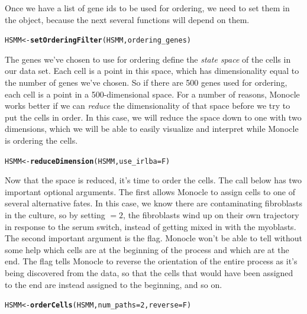 \documentclass[10pt,oneside]{article}\usepackage[]{graphicx}\usepackage[]{color}
\makeatletter
\newcommand{\hlnum}[1]{\textcolor[rgb]{0.686,0.059,0.569}{#1}}%
\newcommand{\hlstd}[1]{\textcolor[rgb]{0.345,0.345,0.345}{#1}}%
\newcommand{\hlkwb}[1]{\textcolor[rgb]{0.69,0.353,0.396}{#1}}%
\newcommand{\hlkwc}[1]{\textcolor[rgb]{0.333,0.667,0.333}{#1}}%
\newcommand{\hlkwd}[1]{\textcolor[rgb]{0.737,0.353,0.396}{\textbf{#1}}}%
\newenvironment{kframe}{%
 \def\at@end@of@kframe{}%
 \ifinner\ifhmode%
  \def\at@end@of@kframe{\end{minipage}}%
  \begin{minipage}{\columnwidth}%
 \fi\fi%
 \def\FrameCommand##1{\hskip\@totalleftmargin \hskip-\fboxsep
 \colorbox{shadecolor}{##1}\hskip-\fboxsep
     \hskip-\linewidth \hskip-\@totalleftmargin \hskip\columnwidth}%
 \MakeFramed {\advance\hsize-\width
   \@totalleftmargin\z@ \linewidth\hsize
   \@setminipage}}%
 {\par\unskip\endMakeFramed%
 \at@end@of@kframe}
\newenvironment{knitrout}{}{} %
\makeatother
\begin{document}
Once we have a list of gene ids to be used for ordering, we need to set them in the  object, because the next several functions will depend on them.

\begin{knitrout}
\color{fgcolor}\begin{kframe}
\begin{alltt}
\hlstd{HSMM} \hlkwb{<-} \hlkwd{setOrderingFilter}\hlstd{(HSMM, ordering_genes)}
\end{alltt}
\end{kframe}
\end{knitrout}


The genes we've chosen to use for ordering define the \emph{state space} of the cells in our data set.  Each cell is a point in this space, which has dimensionality equal to the number of genes we've chosen.  So if there are 500 genes used for ordering, each cell is a point in a 500-dimensional space.  For a number of reasons, Monocle works better if we can \emph{reduce} the dimensionality of that space before we try to put the cells in order.  In this case, we will reduce the space down to one with two dimensions, which we will be able to easily visualize and interpret while Monocle is ordering the cells.
\begin{knitrout}
\color{fgcolor}\begin{kframe}
\begin{alltt}
\hlstd{HSMM} \hlkwb{<-} \hlkwd{reduceDimension}\hlstd{(HSMM,} \hlkwc{use_irlba} \hlstd{= F)}
\end{alltt}
\end{kframe}
\end{knitrout}


Now that the space is reduced, it's time to order the cells.  The call below has two important optional arguments.  The first  allows Monocle to assign cells to one of several alternative fates. In this case, we know there are contaminating fibroblasts in the culture, so by setting $=2$, the fibroblasts wind up on their own trajectory in response to the serum switch, instead of getting mixed in with the myoblasts.  The second important argument is the  flag.  Monocle won't be able to tell without some help which cells are at the beginning of the process and which are at the end.  The  flag tells Monocle to reverse the orientation of the entire process as it's being discovered from the data, so that the cells that would have been assigned to the end are instead assigned to the beginning, and so on.
\begin{knitrout}
\color{fgcolor}\begin{kframe}
\begin{alltt}
\hlstd{HSMM} \hlkwb{<-} \hlkwd{orderCells}\hlstd{(HSMM,} \hlkwc{num_paths} \hlstd{=} \hlnum{2}\hlstd{,} \hlkwc{reverse} \hlstd{= F)}
\end{alltt}
\end{kframe}
\end{knitrout}
\end{document}
